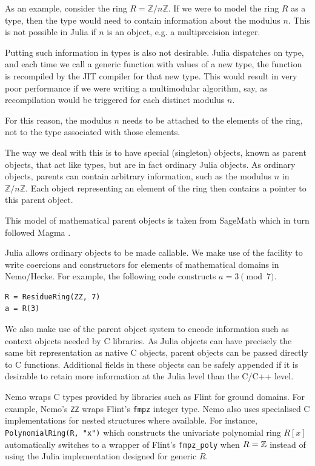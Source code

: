 \documentclass{sig-alternate-05-2015}
\begin{document}
As an example, consider the ring $R = \mathbb{Z}/n\mathbb{Z}$. If we were to model the ring $R$
as a type, then the type would need to contain information about the modulus $n$. This is not
possible in Julia if $n$ is an object, e.g. a multiprecision integer.

Putting such information in types is also not desirable. Julia dispatches on type, and each time
we call a generic function with values of a new type, the function is recompiled by the
JIT compiler for that new type. This would result in very poor performance if we were writing a
multimodular algorithm, say, as recompilation would be triggered for each distinct modulus $n$.

For this reason, the modulus $n$ needs to be attached to the elements of the ring, not to the type
associated with those elements.

The way we deal with this is to have special (singleton) objects, known as parent objects, that act
like types, but are in fact ordinary Julia objects. As ordinary objects, parents can contain
arbitrary information, such as the modulus $n$ in $\mathbb{Z}/n\mathbb{Z}$. Each object representing
an element of the ring then contains a pointer to this parent object.

This model of mathematical parent objects is taken from SageMath \cite{sage} which in turn followed
Magma \cite{magma}.

Julia allows ordinary objects to be made callable. We make use of the facility to write coercions
and constructors for elements of mathematical domains in Nemo/Hecke. For example, the following
code constructs $a = 3 \pmod{7}$.

\begin{verbatim}
R = ResidueRing(ZZ, 7)
a = R(3)
\end{verbatim}

We also make use of the parent object system to encode information such as context objects needed
by C libraries. As Julia objects can have precisely the same bit representation as native C objects,
parent objects can be passed directly to C functions. Additional fields in these objects can be safely
appended if it is desirable to retain more information at the Julia level than the C/C++ level.

Nemo wraps C types provided by libraries such as Flint
for ground domains.
For example, Nemo's \texttt{ZZ} wraps Flint's \texttt{fmpz}
integer type.
Nemo also uses specialised C implementations for nested structures
where available.
For instance, \texttt{PolynomialRing(R, "x")} which constructs
the univariate polynomial ring $R[x]$ automatically switches to
a wrapper of Flint's \texttt{fmpz\_poly} when $R = \mathbb{Z}$
instead of using the Julia implementation designed for generic $R$.
\end{document}
